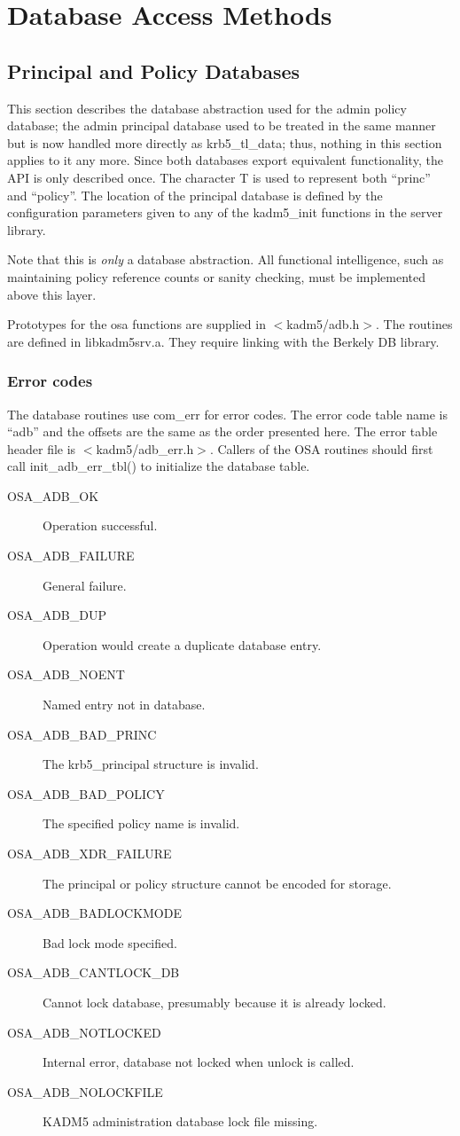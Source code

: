 \section{Database Access Methods}

\subsection{Principal and Policy Databases}

This section describes the database abstraction used for the admin
policy database; the admin principal database used to be treated in
the same manner but is now handled more directly as krb5_tl_data;
thus, nothing in this section applies to it any more.  Since both
databases export equivalent functionality, the API is only described
once.  The character T is used to represent both ``princ'' and
``policy''. The location of the principal database is defined by the
configuration parameters given to any of the kadm5_init functions in
the server library.

Note that this is {\it only} a database abstraction.  All functional
intelligence, such as maintaining policy reference counts or sanity
checking, must be implemented above this layer.

Prototypes for the osa functions are supplied in
$<$kadm5/adb.h$>$. The routines are defined in libkadm5srv.a. They
require linking with the Berkely DB library.

\subsubsection{Error codes}

The database routines use com_err for error codes.  The error code
table name is ``adb'' and the offsets are the same as the order
presented here. The error table header file is
$<$kadm5/adb_err.h$>$. Callers of the OSA routines should first call
init_adb_err_tbl() to initialize the database table.

\begin{description}
\item[OSA_ADB_OK] Operation successful.
\item[OSA_ADB_FAILURE] General failure.
\item[OSA_ADB_DUP] Operation would create a duplicate database entry.
\item[OSA_ADB_NOENT] Named entry not in database.
\item[OSA_ADB_BAD_PRINC] The krb5_principal structure is invalid.
\item[OSA_ADB_BAD_POLICY] The specified policy name is invalid.
\item[OSA_ADB_XDR_FAILURE] The principal or policy structure cannot be
encoded for storage.
\item[OSA_ADB_BADLOCKMODE] Bad lock mode specified.
\item[OSA_ADB_CANTLOCK_DB] Cannot lock database, presumably because it
is already locked.
\item[OSA_ADB_NOTLOCKED] Internal error, database not locked when
unlock is called.
\item[OSA_ADB_NOLOCKFILE] KADM5 administration database lock file missing.
\end{description}

